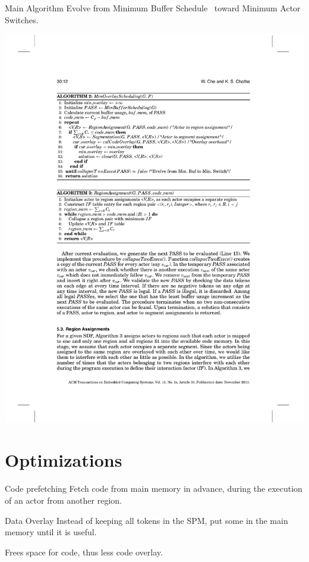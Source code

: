 \documentclass{beamer}
\begin{document}
\begin{frame}{Main Algorithm}
  Evolve from Minimum Buffer Schedule~\cite{jantsch2004modeling} toward Minimum Actor Switches.
  \begin{center}
    \hspace*{-0.1\textwidth}
    \includegraphics[width=1.2\textwidth]{algo2}
  \end{center}
\end{frame}


\section{Optimizations}

\begin{frame}{Code prefetching}
  Fetch code from main memory in advance, during the execution of an actor from another region.
\end{frame}

\begin{frame}{Data Overlay}
  Instead of keeping all tokens in the SPM, put some in the main memory until it is useful.

  Frees space for code, thus less code overlay.
\end{frame}
\end{document}
